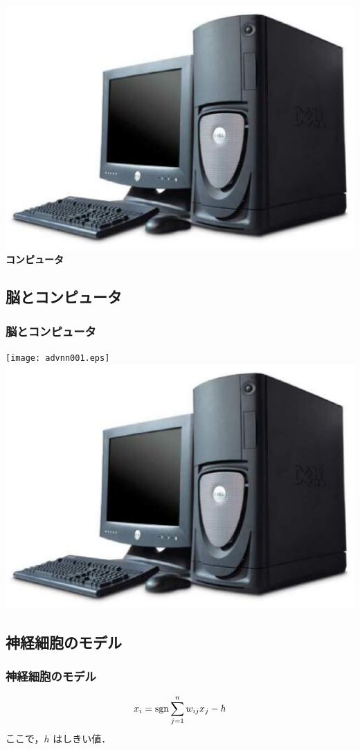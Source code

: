 \documentclass[14pt,dvipdfmx]{beamer}
\begin{document}
\begin{frame}[plain]

  \begin{center}\Huge\bfseries
   \includegraphics[width=.8\linewidth]{computer.eps}\\
   \color{blue}コンピュータ
  \end{center}

\end{frame}

\subsection{脳とコンピュータ}

\begin{frame}

  \frametitle{脳とコンピュータ}
\centering
\texttt{[image: advnn001.eps]}
\includegraphics[width=.48\linewidth]{computer.eps}

\end{frame}


\subsection{神経細胞のモデル}

\begin{frame}

  \frametitle{神経細胞のモデル}
$$
x_i = {\rm sgn} \sum_{j=1}^{n} w_{ij} x_j -h
$$
ここで，$h$ はしきい値．

\end{frame}
\end{document}
